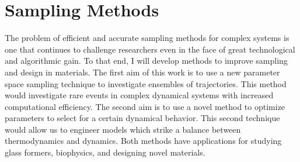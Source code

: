 \documentclass[11pt]{article}
\begin{document}
\section{Sampling Methods}

The problem of efficient and accurate sampling methods for complex systems is one that continues to challenge researchers even in the face of great technological and algorithmic gain.  To that end, I will develop methods to improve sampling and design in materials.  The first aim of this work is to use a new parameter space sampling technique to investigate ensembles of trajectories.  This method would investigate rare events in complex dynamical systems with increased computational efficiency. The second aim is to use a novel method to optimize parameters to select for a certain dynamical behavior.  This second technique would allow us to engineer models which strike a balance between thermodynamics and dynamics.  Both methods have applications for studying glass formers, biophysics, and designing novel materials.


\end{document}
